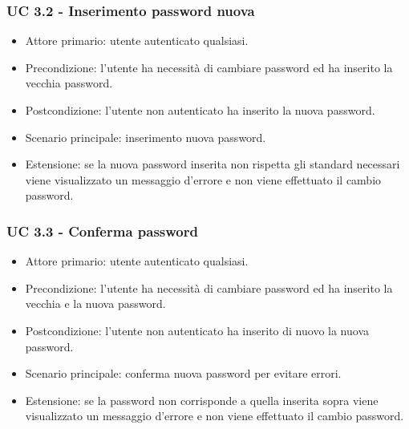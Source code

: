     \subsubsection*{UC 3.2 - Inserimento password nuova}
        \begin{itemize}
            \item Attore primario: utente autenticato qualsiasi.
            \item Precondizione: l'utente ha necessità di cambiare password ed ha inserito la vecchia password.
            \item Postcondizione: l'utente non autenticato ha inserito la nuova password.
            \item Scenario principale: inserimento nuova password.
            \item Estensione: se la nuova password inserita non rispetta gli standard necessari viene visualizzato un messaggio d'errore e non viene effettuato il cambio password.
        \end{itemize}
    \subsubsection*{UC 3.3 - Conferma password}
        \begin{itemize}
            \item Attore primario: utente autenticato qualsiasi.
            \item Precondizione: l'utente ha necessità di cambiare password ed ha inserito la vecchia e la nuova password.
            \item Postcondizione: l'utente non autenticato ha inserito di nuovo la nuova password.
            \item Scenario principale: conferma nuova password per evitare errori.
            \item Estensione: se la password non corrisponde a quella inserita sopra viene visualizzato un messaggio d'errore e non viene effettuato il cambio password.
        \end{itemize}
